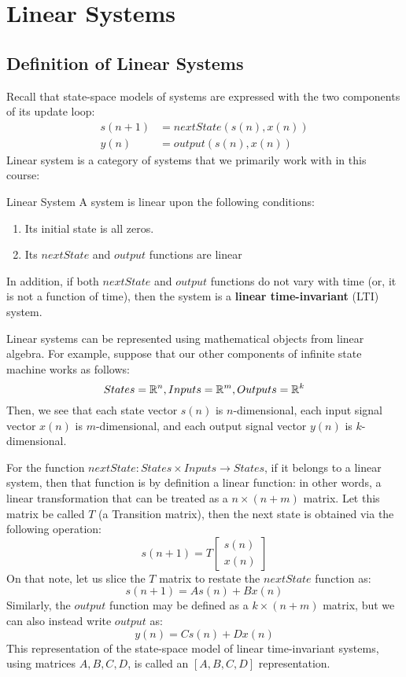 \chapter{Linear Systems}

\section{Definition of Linear Systems}
Recall that state-space models of systems are expressed with the two components of its update loop:
\begin{align*}
    s(n + 1) &= nextState(s(n), x(n)) \\
    y(n) &= output(s(n), x(n))
\end{align*}
Linear system is a category of systems that we primarily work with in this course:
\begin{ln-define}{Linear System}{}
    A system is linear upon the following conditions:
    \begin{enumerate}
        \item Its initial state is all zeros.
        \item Its $nextState$ and $output$ functions are linear
    \end{enumerate}
    In addition, if both $nextState$ and $output$ functions do not vary with time (or, it is not a function of time), then the system is a \textbf{linear time-invariant} (LTI) system.
\end{ln-define}

Linear systems can be represented using mathematical objects from linear algebra.
For example, suppose that our other components of infinite state machine works as follows:
\[
    States= \mathbb{R}^n, Inputs = \mathbb{R}^m, Outputs = \mathbb{R}^k
\]
Then, we see that each state vector $s(n)$ is $n$-dimensional, each input signal vector $x(n)$ is $m$-dimensional, and each output signal vector $y(n)$ is $k$-dimensional.

For the function $nextState: States \times Inputs \rightarrow States$, if it belongs to a linear system, then that function is by definition a linear function: in other words, a linear transformation that can be treated as a $n \times (n + m)$ matrix.
Let this matrix be called $T$ (a Transition matrix), then the next state is obtained via the following operation:
\[
    s(n + 1) = T \begin{bmatrix} s(n) \\ x(n) \end{bmatrix}
\]
On that note, let us slice the $T$ matrix to restate the $nextState$ function as:
\[
    s(n + 1) = A s(n) + B x(n)
\]
Similarly, the $output$ function may be defined as a $k \times (n + m)$ matrix, but we can also instead write $output$ as:
\[
    y(n) = C s(n) + D x(n)
\]
This representation of the state-space model of linear time-invariant systems, using matrices $A, B, C, D$, is called an $[A, B, C, D]$ representation.


